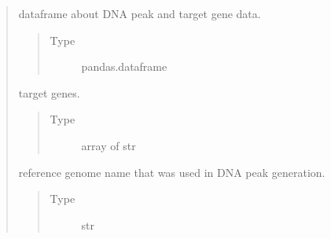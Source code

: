 \documentclass[letterpaper,10pt,english]{sphinxmanual}
\begin{document}
\begin{quote}
\begin{fulllineitems}
\begin{fulllineitems}
\label{\detokenize{modules/celloracle.motif_analysis:celloracle.motif_analysis.TFinfo.peak_df}}
dataframe about DNA peak and target gene data.
\begin{quote}\begin{description}
\item[{Type}] \leavevmode
pandas.dataframe

\end{description}\end{quote}

\end{fulllineitems}


\begin{fulllineitems}
\label{\detokenize{modules/celloracle.motif_analysis:celloracle.motif_analysis.TFinfo.all_target_gene}}
target genes.
\begin{quote}\begin{description}
\item[{Type}] \leavevmode
array of str

\end{description}\end{quote}

\end{fulllineitems}


\begin{fulllineitems}
\label{\detokenize{modules/celloracle.motif_analysis:celloracle.motif_analysis.TFinfo.ref_genome}}
reference genome name that was used in DNA peak generation.
\begin{quote}\begin{description}
\item[{Type}] \leavevmode
str

\end{description}\end{quote}

\end{fulllineitems}


\end{fulllineitems}
\end{quote}
\end{document}
